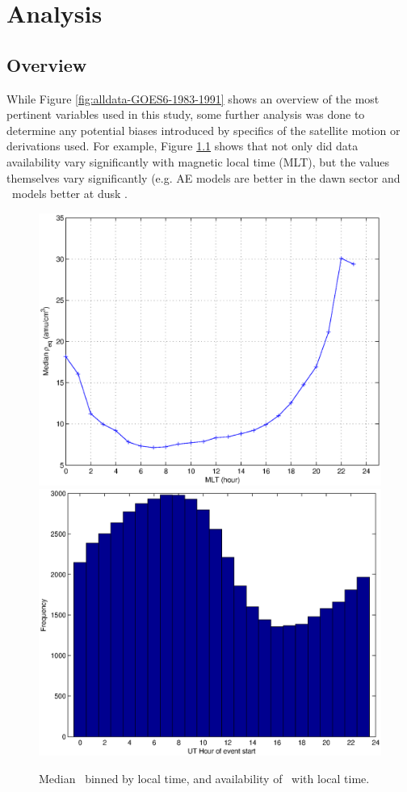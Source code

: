 \chapter[Analysis]{Analysis}

\section{Overview}
While Figure \ref{fig:alldata-GOES6-1983-1991} shows an overview of the most pertinent variables used in this study, some further analysis was done to determine any potential biases introduced by specifics of the satellite motion or derivations used. For example, Figure \ref{fig:ByHourExample} shows that not only did data availability vary significantly with magnetic local time (MLT), but the values themselves vary significantly (e.g. AE models are better in the dawn sector and \dst\ models better at dusk \citep{OBrien2003EmpiricalPlasmapause}. 

\begin{figure}[htp!]
\centering
\includegraphics[width=0.7\linewidth]{Figures/rhoMLT.eps}
\includegraphics[width=0.7\linewidth]{Figures/nansbyhour.eps}
\caption{Median \req\ binned by local time, and availability of \req\ with local time.}
\label{fig:ByHourExample}
\end{figure}


